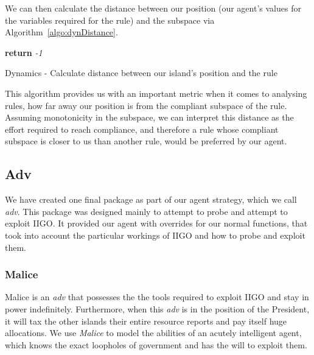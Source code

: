 \documentclass{article}
\begin{document}
We can then calculate the distance between our position (our agent's values for the variables required for the rule) and the subspace via Algorithm~\ref{algo:dynDistance}.

\begin{algorithm}[H]
\DontPrintSemicolon %
  {
   \textbf{return} \textit{-1}\;
 }
 
\caption{Dynamics - Calculate distance between our island's position and the rule}
\label{algo:dynDistance}
\end{algorithm}

This algorithm provides us with an important metric when it comes to analysing rules, how far away our position is from the compliant subspace of the rule. Assuming monotonicity in the subspace, we can interpret this distance as the effort required to reach compliance, and therefore a rule whose compliant subspace is closer to us than another rule, would be preferred by our agent. \\

\subsection{Adv}
We have created one final package as part of our agent strategy, which we call \emph{adv}. This package was designed mainly to attempt to probe and attempt to exploit IIGO. It provided our agent with overrides for our normal functions, that took into account the particular workings of IIGO and how to probe and exploit them.\\

\subsubsection{Malice}
Malice is an \emph{adv} that possesses the the tools required to exploit IIGO and stay in power indefinitely. Furthermore, when this \emph{adv} is in the position of the President, it will tax the other islands their entire resource reports and pay itself huge allocations. We use \emph{Malice} to model the abilities of an acutely intelligent agent, which knows the exact loopholes of government and has the will to exploit them.
\end{document}
